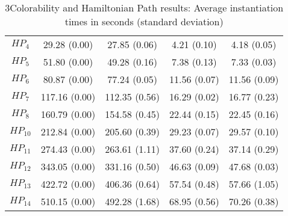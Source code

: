 \documentclass[preprint]{tlp}
\begin{document}
\begin{table}[b!]
{\begin{tabular}{| c | c | c | c | c |}
$HP_4$ & 29.28 (0.00) & 27.85 (0.06) & 4.21 (0.10) & 4.18 (0.05) \\ 
$HP_5$ & 51.80 (0.00) & 49.28 (0.16) & 7.38 (0.13) & 7.33 (0.03) \\ 
$HP_6$ & 80.87 (0.00) & 77.24 (0.05) & 11.56 (0.07) & 11.56 (0.09) \\ 
$HP_7$ & 117.16 (0.00) & 112.35 (0.56) & 16.29 (0.02) & 16.77 (0.23) \\ 
$HP_8$ & 160.79 (0.00) & 154.58 (0.45) & 22.44 (0.15) & 22.45 (0.16) \\ 
$HP_{10}$ & 212.84 (0.00) & 205.60 (0.39) & 29.23 (0.07) & 29.57 (0.10) \\ 
$HP_{11}$ & 274.43 (0.00) & 263.61 (1.11) & 37.60 (0.24) & 37.14 (0.29) \\ 
$HP_{12}$ & 343.05 (0.00) & 331.16 (0.50) & 46.63 (0.09) & 47.68 (0.03) \\ 
$HP_{13}$ & 422.72 (0.00) & 406.36 (0.64) & 57.54 (0.48) & 57.66 (1.05) \\ 
$HP_{14}$ & 510.15 (0.00) & 492.28 (1.68) & 68.95 (0.56) & 70.26 (0.38) \\
\cline{1-5}
\end{tabular}
\caption{3Colorability and Hamiltonian Path results: Average instantiation times in seconds (standard deviation) }
\label{tab_1}
}
\end{table}
\end{document}

